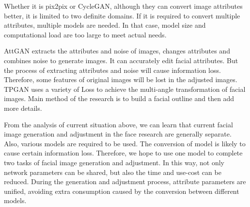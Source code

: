 Whether it is pix2pix or CycleGAN,
    although they can convert image attributes better,
    it is limited to two definite domains.
If it is required to convert multiple attributes, multiple models are needed.
In that case, model size and computational load are too large to meet actual needs.

AttGAN extracts the attributes and noise of images,
    changes attributes and combines noise to generate images.
It can accurately edit facial attributes.
But the process of extracting attributes and noise will cause information loss.
Therefore, some features of original images will be lost in the adjusted images.
TPGAN uses a variety of Loss to achieve the multi-angle transformation of facial images.
Main method of the research is to build a facial outline and then add more details.



\vspace{3ex}

From the analysis of current situation above,
    we can learn that current facial image generation and adjustment in the face research are generally separate.
Also, various models are required to be used.
The conversion of model is likely to cause certain information loss.
Therefore, we hope to use one model to complete two tasks of facial image generation and adjustment.
In this way, not only network parameters can be shared,
    but also the time and use-cost can be reduced.
During the generation and adjustment process, attribute parameters are unified,
    avoiding extra consumption caused by the conversion between different models.
